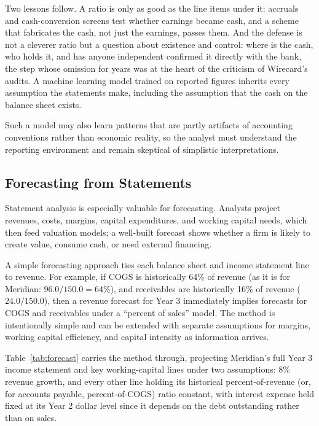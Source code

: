 \documentclass[../ai_in_finance]{subfiles}
\begin{document}
Two lessons follow. A ratio is only as good as the line items under it: accruals and cash-conversion screens test whether earnings became cash, and a scheme that fabricates the cash, not just the earnings, passes them. And the defense is not a cleverer ratio but a question about existence and control: where is the cash, who holds it, and has anyone independent confirmed it directly with the bank, the step whose omission for years was at the heart of the criticism of Wirecard's audits. A machine learning model trained on reported figures inherits every assumption the statements make, including the assumption that the cash on the balance sheet exists.

Such a model may also learn patterns that are partly artifacts of accounting conventions rather than economic reality, so the analyst must understand the reporting environment and remain skeptical of simplistic interpretations.

\subsection{Forecasting from Statements}

Statement analysis is especially valuable for forecasting. Analysts project revenues, costs, margins, capital expenditures, and working capital needs, which then feed valuation models; a well-built forecast shows whether a firm is likely to create value, consume cash, or need external financing.

A simple forecasting approach ties each balance sheet and income statement line to revenue. For example, if COGS is historically 64\% of revenue (as it is for Meridian: $96.0/150.0 = 64\%$), and receivables are historically 16\% of revenue ($24.0/150.0$), then a revenue forecast for Year 3 immediately implies forecasts for COGS and receivables under a ``percent of sales'' model. The method is intentionally simple and can be extended with separate assumptions for margins, working capital efficiency, and capital intensity as information arrives.

Table~\ref{tab:forecast} carries the method through, projecting Meridian's full Year 3 income statement and key working-capital lines under two assumptions: 8\% revenue growth, and every other line holding its historical percent-of-revenue (or, for accounts payable, percent-of-COGS) ratio constant, with interest expense held fixed at its Year 2 dollar level since it depends on the debt outstanding rather than on sales.
\end{document}
